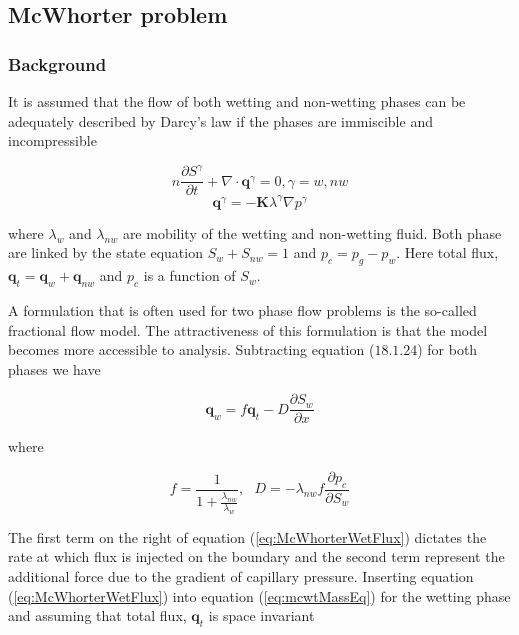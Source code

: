 \subsection{McWhorter problem}
\subsubsection*{Background}
It is assumed that the flow of both wetting and non-wetting phases can be adequately described by Darcy's law if the phases are immiscible and incompressible

\begin{equation}
n\frac{\partial S^{\gamma}}{\partial t} + \nabla \cdot \mathbf{q}^{\gamma} = 0, \gamma=w, nw
\label{eq:mcwtMassEq}
\end{equation}
\begin{equation}
\mathbf{q}^{\gamma}=-{\mathbf K} \lambda^{\gamma} \nabla p^{\gamma}
\label{eq:mcwtFluxEq}
\end{equation}

where $\lambda_w$ and  $\lambda_{nw}$ are mobility of the wetting and non-wetting fluid. Both phase are linked by the state equation $S_w+S_{nw}=1$ and $p_c=p_g-p_w$. Here total flux, $\mathbf {q}_t=\mathbf {q}_w + \mathbf {q}_{nw}$ and $p_c$ is a function of $S_w$.

A formulation that is often used for two phase flow problems is the so-called fractional flow model. The attractiveness of this formulation is that the model becomes more accessible to analysis. Subtracting equation ($18.1.24$) for both phases we have

\begin{equation}
\mathbf {q}_w=f \mathbf {q}_t- D \frac{\partial S_w}{\partial x}
\label{eq:McWhorterWetFlux}
\end{equation}

where 

\begin{equation}
f=\frac{1}{1 + \frac{\lambda_{nw}}{\lambda_w}},~~~D=-\lambda_{nw} f \frac{\partial p_c}{\partial S_w}
\end{equation}

The first term on the right of equation (\ref{eq:McWhorterWetFlux}) dictates the rate at which flux is injected on the boundary and the second term represent the additional force due to the gradient of capillary pressure. Inserting equation (\ref{eq:McWhorterWetFlux}) into equation (\ref{eq:mcwtMassEq}) for the wetting phase and assuming that total flux, $\mathbf q_t$ is space invariant

